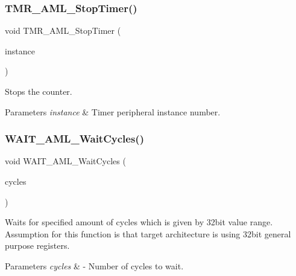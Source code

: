 \subsubsection{\texorpdfstring{TMR\_AML\_StopTimer()}{TMR\_AML\_StopTimer()}}
{\footnotesize\ttfamily void T\+M\+R\+\_\+\+A\+M\+L\+\_\+\+Stop\+Timer (\begin{DoxyParamCaption}\item[{\mbox{\hyperlink{common__aml_8h_a562bd37c7d07adcedec5993bc0cd96e5}{aml\+\_\+instance\+\_\+t}}}]{instance }\end{DoxyParamCaption})}



Stops the counter. 


\begin{DoxyParams}{Parameters}
{\em instance} & Timer peripheral instance number. \\
\hline
\end{DoxyParams}
\mbox{\label{group__function__group_ga1b85420a1a98dd13e15b8b515f2be603}} 
\subsubsection{\texorpdfstring{WAIT\_AML\_WaitCycles()}{WAIT\_AML\_WaitCycles()}}
{\footnotesize\ttfamily void W\+A\+I\+T\+\_\+\+A\+M\+L\+\_\+\+Wait\+Cycles (\begin{DoxyParamCaption}\item[{uint32\+\_\+t}]{cycles }\end{DoxyParamCaption})}



Waits for specified amount of cycles which is given by 32bit value range. Assumption for this function is that target architecture is using 32bit general purpose registers. 


\begin{DoxyParams}{Parameters}
{\em cycles} & -\/ Number of cycles to wait. \\
\hline
\end{DoxyParams}
\mbox{\label{group__function__group_ga91059b3fe779d0ca7074c59bacb42f59}} 
